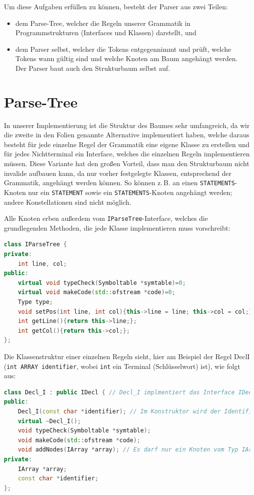 \documentclass[listof=totoc,DIV11,a4paper]{scrreprt}
\begin{document}
Um diese Aufgaben erfüllen zu können, besteht der Parser aus zwei Teilen:
\begin{itemize}
\item dem Parse-Tree, welcher die Regeln unserer Grammatik in Programmstrukturen (Interfaces und Klassen) darstellt, und 
\item dem Parser selbst, welcher die Tokens entgegennimmt und prüft, welche Tokens wann gültig sind und welche Knoten am Baum angehängt werden. Der Parser baut auch den Strukturbaum selbst auf.
\end{itemize}

\section{Parse-Tree}\label{sec:parsetree}
In unserer Implementierung ist die Struktur des Baumes sehr umfangreich, da wir die zweite in den Folien genannte Alternative implementiert haben, welche daraus besteht für jede einzelne Regel der Grammatik eine eigene Klasse zu erstellen und für jedes Nichtterminal ein Interface, welches die einzelnen Regeln implementieren müssen. Diese Variante hat den großen Vorteil, dass man den Strukturbaum nicht invalide aufbauen kann, da nur vorher festgelegte Klassen, entsprechend der Grammatik, angehängt werden können. So können z.\,B. an einen \verb+STATEMENTS+-Knoten nur ein \verb+STATEMENT+ sowie ein \verb+STATEMENTS+-Knoten angehängt werden; andere Konstellationen sind nicht möglich.

Alle Knoten erben außerdem vom \verb+IParseTree+-Interface, welches die grundlegenden Methoden, die jede Klasse implementieren muss vorschreibt:

\begin{lstlisting}[language=C++,label=lst:parsetree,caption=Parser: IParseTree-Interface]
class IParseTree {
private:
    int line, col;
public:
    virtual void typeCheck(Symboltable *symtable)=0;
    virtual void makeCode(std::ofstream *code)=0;
    Type type;
    void setPos(int line, int col){this->line = line; this->col = col;};
    int getLine(){return this->line;};
    int getCol(){return this->col;};
};
\end{lstlisting}

Die Klassenstruktur einer einzelnen Regeln sieht, hier am Beispiel der Regel Decl\textunderscore I (\verb+int ARRAY identifier+, wobei \verb+int+ ein Terminal (Schlüsselwort) ist), wie folgt aus:

\begin{lstlisting}[language=C++,label=lst:decl_i,caption=Parser: Klassenstruktur von Decl\textunderscore I]
class Decl_I : public IDecl { // Decl_I implmentiert das Interface IDecl
public:
    Decl_I(const char *identifier); // Im Konstruktor wird der Identifier uebergeben
    virtual ~Decl_I();
    void typeCheck(Symboltable *symtable);
    void makeCode(std::ofstream *code);
    void addNodes(IArray *array); // Es darf nur ein Knoten vom Typ IArray angehaengt werden
private:
    IArray *array;
    const char *identifier;
};
\end{lstlisting}
\end{document}

